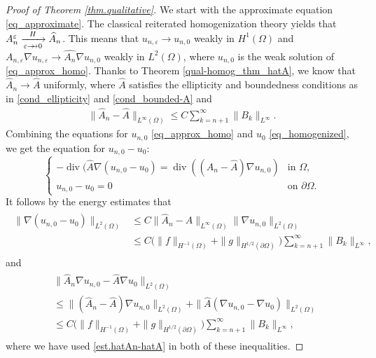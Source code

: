\documentclass[reqno,12pt]{amsart} %
\theoremstyle{definition}
\theoremstyle{remark}
\numberwithin{equation}{section}
\newcommand{\e}{\varepsilon}
\DeclareMathOperator{\diver}{div}
\newcommand{\doublerightarrow}{%
  \mathrel{%
    \mathchoice
      {\rightarrow\mspace{-10mu}\rightarrow} %
      {\rightarrow\mspace{-10mu}\rightarrow} %
      {\rightarrow\mspace{-10mu}\rightarrow} %
      {\rightarrow\mspace{-10mu}\rightarrow} %
  }%
}
\begin{document}
\begin{proof} [Proof of Theorem \ref{thm.qualitative}]
    We start with the approximate equation \eqref{eq_approximate}. The classical reiterated homogenization theory yields that $A_n^\varepsilon\xrightarrow[\varepsilon\doublerightarrow 0]{H} \widehat{A}_n$. This means that $u_{n,\e} \to u_{n,0}$ weakly in $H^1(\Omega)$ and $A_{n,\e} \nabla u_{n,\e} \to \widehat{A_{n}} \nabla u_{n,0}$ weakly in $L^2(\Omega)$, where $u_{n,0}$ is the weak solution of \eqref{eq_approx_homo}.
    Thanks to Theorem \ref{qual-homog_thm_hatA}, we know that $\widehat{A}_n \to \widehat{A}$ uniformly, where $\widehat{A}$ satisfies the ellipticity and boundedness conditions as in \eqref{cond_ellipticity} and \eqref{cond_bounded-A} and
  \begin{align*}
    \| \widehat{A}_n - \widehat{A} \|_{L^\infty(\Omega)} \le C \sum_{k=n+1}^\infty \|B_k\|_{L^\infty}.
  \end{align*}
    Combining the equations for $u_{n,0}$ \eqref{eq_approx_homo} and $u_0$ \eqref{eq_homogenized}, we get the equation for $u_{n,0} - u_0$:
    \begin{equation*}
    \begin{cases}
      -\diver(\widehat{A}\nabla (u_{n,0} - u_0)= \diver ((\widehat{A}_n - \widehat{A}) \nabla u_{n,0}) &\text{in }\Omega,\\
      u_{n,0} - u_0 = 0&\text{on }\partial\Omega.
    \end{cases}
  \end{equation*}
  It follows by the energy estimates that 
  \begin{align}\label{qual-homog_conver_u0}
  \begin{aligned}
      \|\nabla(u_{n, 0}-u_0)\|_{L^2(\Omega)} & \leq C\|\widehat{A}_n-\widehat{A}\|_{L^\infty(\Omega)} \| \nabla u_{n,0}\|_{L^2(\Omega)} \\
      & \leq C \Big(\| f\|_{H^{-1}(\Omega)} + \| g\|_{H^{1/2}(\partial \Omega)} \Big) \sum_{k=n+1}^\infty \|B_k\|_{L^\infty},
  \end{aligned}
  \end{align}
  and
  \begin{align}\label{est.flux.An-A0}
  \begin{split}
    &\|\widehat{A}_n\nabla u_{n, 0}-\widehat{A}\nabla u_0\|_{L^2(\Omega)}\\
    &\leq \|(\widehat{A}_n-\widehat{A})\nabla u_{n, 0}\|_{L^2(\Omega)}+\|\widehat{A}(\nabla u_{n, 0}-\nabla u_0)\|_{L^2(\Omega)}\\
    &\leq C\Big(\| f\|_{H^{-1}(\Omega)} + \| g\|_{H^{1/2}(\partial \Omega)} \Big) \sum_{k=n+1}^\infty \|B_k\|_{L^\infty},
    \end{split}
  \end{align}
  where we have used \eqref{est.hatAn-hatA} in both of these inequalities.
  

\end{proof}
\end{document}
